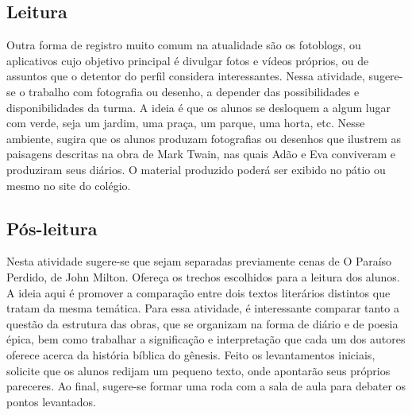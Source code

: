 \documentclass[12pt]{extarticle}
\begin{document}

\subsection{Leitura}


Outra forma de registro muito comum na atualidade são os
fotoblogs, ou aplicativos cujo objetivo principal é divulgar fotos e
vídeos próprios, ou de assuntos que o detentor do perfil considera
interessantes. Nessa atividade, sugere-se o trabalho com fotografia ou
desenho, a depender das possibilidades e disponibilidades da turma. A
ideia é que os alunos se desloquem a algum lugar com verde, seja um
jardim, uma praça, um parque, uma horta, etc. Nesse ambiente, sugira que
os alunos produzam fotografias ou desenhos que ilustrem as paisagens
descritas na obra de Mark Twain, nas quais Adão e Eva conviveram e
produziram seus diários. O material produzido poderá ser exibido no
pátio ou mesmo no site do colégio.


\subsection{Pós-leitura}


Nesta atividade sugere-se que sejam separadas previamente
cenas de O Paraíso Perdido, de John Milton. Ofereça os trechos
escolhidos para a leitura dos alunos. A ideia aqui é promover a
comparação entre dois textos literários distintos que tratam da mesma
temática. Para essa atividade, é interessante comparar tanto a questão
da estrutura das obras, que se organizam na forma de diário e de poesia
épica, bem como trabalhar a significação e interpretação que cada um dos
autores oferece acerca da história bíblica do gênesis. Feito os
levantamentos iniciais, solicite que os alunos redijam um pequeno texto,
onde apontarão seus próprios pareceres. Ao final, sugere-se formar uma
roda com a sala de aula para debater os pontos levantados.
\end{document}
